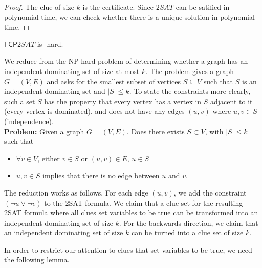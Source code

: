 \documentclass[runningheads,a4paper]{llncs}
\begin{document}
\begin{proof}
The clue of size $k$ is the certificate. Since $2SAT$ can be satified in polynomial time, we can check whether there is a unique solution in polynomial time.
\end{proof}

\begin{theorem} 
$\mathsf{FCP} 2SAT$ is \NP-hard.
\end{theorem}

We reduce from the NP-hard problem of determining whether a graph has an independent dominating set of size at most $k$. The problem gives a graph $G = (V,E)$ and asks for the smallest subset of vertices $S \subseteq V$ such that $S$ is an independent dominating set and $|S| \leq k$. To state the constraints more clearly, such a set $S$ has the property that every vertex has a vertex in $S$ adjacent to it (every vertex is dominated), and does not have any edges $(u,v)$ where $u,v \in S$ (independence). \\

\noindent\textbf{Problem:} Given a graph $G = (V, E)$. Does there exists $S \subset V$, with $|S| \leq k$ such that 
\begin{itemize}
\item $\forall v \in V$, either $v \in S$ or $(u, v) \in E$, $u \in S$ 
\item $u, v \in S$ implies that there is no edge between $u$ and $v$. 
\end{itemize}

The reduction works as follows. For each edge $(u,v)$, we add the constraint $(\neg u \vee \neg v)$ to the 2SAT formula. We claim that a clue set for the resulting 2SAT formula where all clues set variables to be true can be transformed into an independent dominating set of size $k$. For the backwards direction, we claim that an independent dominating set of size $k$ can be turned into a clue set of size $k$. 

%

In order to restrict our attention to clues that set variables to be true, we need the following lemma.
\end{document}
